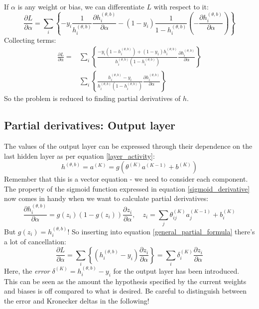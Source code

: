 \documentclass[12pt, a4paper]{article}
\numberwithin{equation}{section}
\begin{document}
If $\alpha$ is any weight or bias, we can differentiate $L$ with respect to it:
\begin{equation}
\frac{\partial L}{\partial\alpha}=\sum_i\left\{-y_i\frac{1}{h^{(\theta,b)}_i}\frac{\partial h^{(\theta,b)}_i}{\partial\alpha}-(1-y_i)\frac{1}{1-h^{(\theta,b)}_i}\left(-\frac{\partial h^{(\theta,b)}_i}{\partial\alpha}\right)\right\}
\end{equation}
Collecting terms:
\begin{align}
\frac{\partial L}{\partial\alpha}=&\sum_i\left\{\frac{-y_i\left(1-h^{(\theta,b)}_i\right)+(1-y_1)h^{(\theta,b)}_i}{h^{(\theta,b)}_i(1-h^{(\theta,b)}_i)}\frac{\partial h^{(\theta,b)}_i}{\partial\alpha}\right\}\\
&\sum_i\left\{\frac{h^{(\theta,b)}_i-y_i}{h^{(\theta,b)}_i\left(1-h^{(\theta,b)}_i\right)}\frac{\partial h^{(\theta,b)}_i}{\partial\alpha}\right\}
\label{general_partial_formula}
\end{align}
So the problem is reduced to finding partial derivatives of $h$.

\subsection{Partial derivatives: Output layer}
The values of the output layer can be expressed through their dependence on the last hidden layer as per equation \ref{layer_activity}:
\begin{equation}
h^{(\theta,b)}=a^{(K)}=g(\theta^{(K)}a^{(K-1)}+b^{(K)})
\end{equation}
Remember that this is a vector equation - we need to consider each component. The property of the sigmoid function expressed in equation \ref{sigmoid_derivative} now comes in handy when we want to calculate partial derivatives:
\begin{equation}
\frac{\partial h^{(\theta,b)}_i}{\partial\alpha}=g(z_i)(1-g(z_i))\frac{\partial z_i}{\partial\alpha},\quad z_i=\sum_j\theta^{(K)}_{ij}a^{(K-1)}_j+b^{(K)}_i
\end{equation}
But $g(z_i)=h^{(\theta,b)}_i$! So inserting into equation \ref{general_partial_formula} there's a lot of cancellation:
\begin{equation}
\frac{\partial L}{\partial\alpha}=\sum_i\left\{\left(h^{(\theta,b)}_i-y_i\right)\frac{\partial z_i}{\partial\alpha}\right\}=\sum_i\delta^{(K)}_i\frac{\partial z_i}{\partial\alpha}
\label{general_partial_formula2}
\end{equation}
Here, the \textit{error} $\delta^{(K)}=h^{(\theta,b)}_i-y_i$ for the output layer has been introduced. This can be seen as the amount the hypothesis specified by the current weights and biases is off compared to what is desired. Be careful to distinguish between the error and Kronecker deltas in the following!
\end{document}
